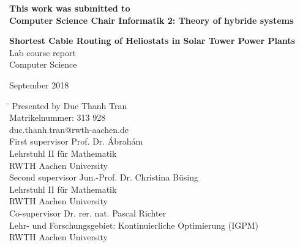 
	\begin{titlepage}
		\small
		\vspace*{4mm}%
		\parindent0pt%
		\begin{center}
			\bfseries This work was submitted to\\
			Computer Science Chair Informatik 2: Theory of hybride systems
		\end{center}
		\vspace*{25mm}
		\normalsize	
		\begin{center}
			\Large
            {\bfseries\sffamily Shortest Cable Routing of Heliostats in Solar Tower Power Plants}
			\\[20mm]
			\large
			Lab course report\\ Computer Science
		\end{center}
		\vfill
		\begin{center}
		\large September 2018
		\end{center}
		\vfill
	
	\begin{tabbing}
		\hspace*{4cm}\=\kill
		Presented by
		\> Duc Thanh Tran \\
		\> Matrikelnummer: 313 928 \\
		\> duc.thanh.tran@rwth-aachen.de \\[3mm]
																		
                                                                        
    	First supervisor
    	\> Prof. Dr. Ábrahám \\
    	\> Lehrstuhl II für Mathematik\\
    	\> RWTH Aachen University\\[3mm]
        
		Second supervisor
		\> Jun.-Prof. Dr. Christina Büsing\\
		\> Lehrstuhl II für Mathematik\\
		\> RWTH Aachen University\\[3mm]
        	
		Co-supervisor
		\> Dr. rer. nat. Pascal Richter\\
		\> Lehr- und Forschungsgebiet: Kontinuierliche Optimierung (IGPM)\\
		\> RWTH Aachen University
	\end{tabbing}

	\end{titlepage}
	
